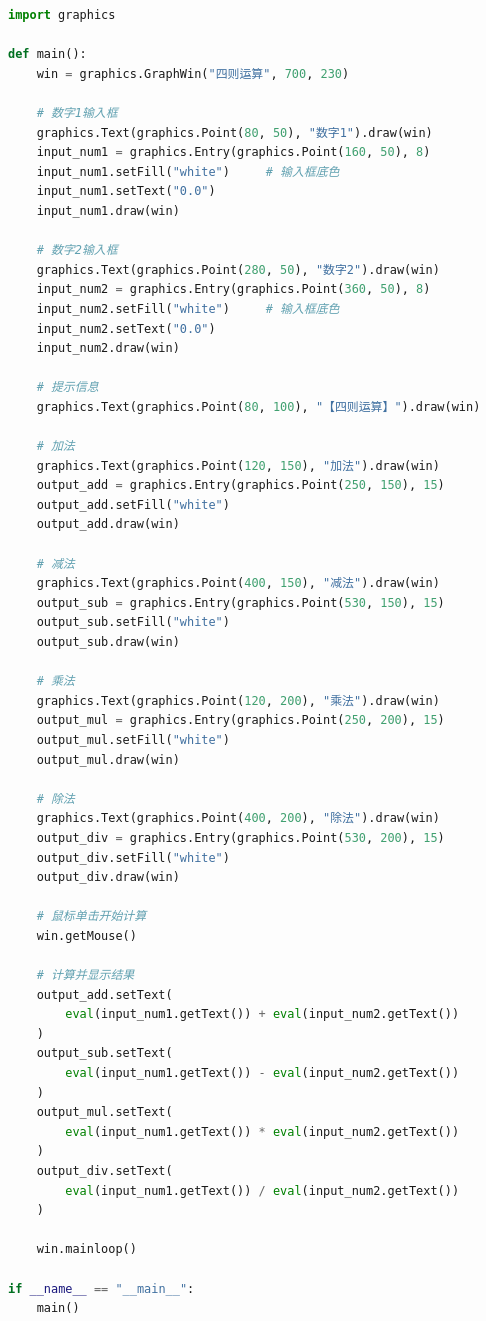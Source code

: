 \begin{lstlisting}[language=Python]
import graphics

def main():
    win = graphics.GraphWin("四则运算", 700, 230)

    # 数字1输入框
    graphics.Text(graphics.Point(80, 50), "数字1").draw(win)
    input_num1 = graphics.Entry(graphics.Point(160, 50), 8)
    input_num1.setFill("white")     # 输入框底色
    input_num1.setText("0.0")
    input_num1.draw(win)

    # 数字2输入框
    graphics.Text(graphics.Point(280, 50), "数字2").draw(win)
    input_num2 = graphics.Entry(graphics.Point(360, 50), 8)
    input_num2.setFill("white")     # 输入框底色
    input_num2.setText("0.0")
    input_num2.draw(win)

    # 提示信息
    graphics.Text(graphics.Point(80, 100), "【四则运算】").draw(win)

    # 加法
    graphics.Text(graphics.Point(120, 150), "加法").draw(win)
    output_add = graphics.Entry(graphics.Point(250, 150), 15)
    output_add.setFill("white")
    output_add.draw(win)

    # 减法
    graphics.Text(graphics.Point(400, 150), "减法").draw(win)
    output_sub = graphics.Entry(graphics.Point(530, 150), 15)
    output_sub.setFill("white")
    output_sub.draw(win)

    # 乘法
    graphics.Text(graphics.Point(120, 200), "乘法").draw(win)
    output_mul = graphics.Entry(graphics.Point(250, 200), 15)
    output_mul.setFill("white")
    output_mul.draw(win)

    # 除法
    graphics.Text(graphics.Point(400, 200), "除法").draw(win)
    output_div = graphics.Entry(graphics.Point(530, 200), 15)
    output_div.setFill("white")
    output_div.draw(win)

    # 鼠标单击开始计算
    win.getMouse()

    # 计算并显示结果
    output_add.setText(
        eval(input_num1.getText()) + eval(input_num2.getText())
    )
    output_sub.setText(
        eval(input_num1.getText()) - eval(input_num2.getText())
    )
    output_mul.setText(
        eval(input_num1.getText()) * eval(input_num2.getText())
    )
    output_div.setText(
        eval(input_num1.getText()) / eval(input_num2.getText())
    )

    win.mainloop()

if __name__ == "__main__":
    main()
\end{lstlisting}

